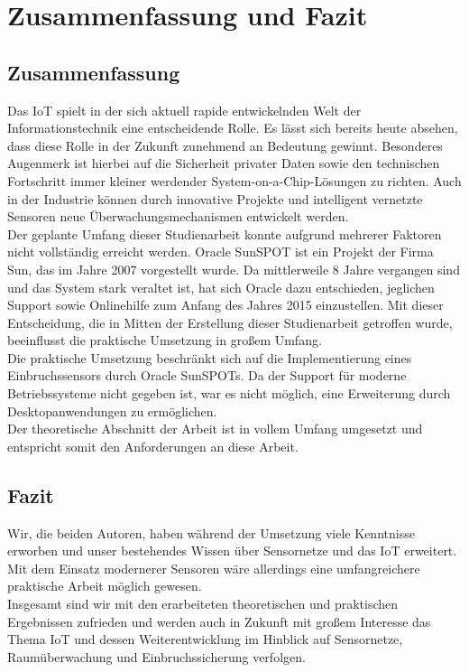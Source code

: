 \chapter{Zusammenfassung und Fazit}\label{c:Zusammenfassung} %

\section*{Zusammenfassung}
Das \ac{IoT} spielt in der sich aktuell rapide entwickelnden Welt der Informationstechnik eine entscheidende Rolle. Es lässt sich bereits heute absehen, dass diese Rolle in der Zukunft zunehmend an Bedeutung gewinnt. Besonderes Augenmerk ist hierbei auf die Sicherheit privater Daten sowie den technischen Fortschritt immer kleiner werdender System-on-a-Chip-Lösungen zu richten. Auch in der Industrie können durch innovative Projekte und intelligent vernetzte Sensoren neue Überwachungsmechanismen entwickelt werden.\\

Der geplante Umfang dieser Studienarbeit konnte aufgrund mehrerer Faktoren nicht vollständig erreicht werden. 
Oracle SunSPOT ist ein Projekt der Firma Sun, das im Jahre 2007 vorgestellt wurde. Da mittlerweile 8 Jahre vergangen sind und das System stark veraltet ist, hat sich Oracle dazu entschieden, jeglichen Support sowie Onlinehilfe zum Anfang des Jahres 2015 einzustellen. Mit dieser Entscheidung, die in Mitten der Erstellung dieser Studienarbeit getroffen wurde, beeinflusst die praktische Umsetzung in großem Umfang.\\

Die praktische Umsetzung beschränkt sich auf die Implementierung eines Einbruchssensors durch Oracle SunSPOTs. Da der Support für moderne Betriebssysteme nicht gegeben ist, war es nicht möglich, eine Erweiterung durch Desktopanwendungen zu ermöglichen. \\

Der theoretische Abschnitt der Arbeit ist in vollem Umfang umgesetzt und entspricht somit den Anforderungen an diese Arbeit.\newpage

\section*{Fazit}

Wir, die beiden Autoren, haben während der Umsetzung viele Kenntnisse erworben und unser bestehendes Wissen über Sensornetze und das \ac{IoT} erweitert. Mit dem Einsatz modernerer Sensoren wäre allerdings eine umfangreichere praktische Arbeit möglich gewesen.\\

Insgesamt sind wir mit den erarbeiteten theoretischen und praktischen Ergebnissen zufrieden und werden auch in Zukunft mit großem Interesse das Thema \ac{IoT} und dessen Weiterentwicklung im Hinblick auf Sensornetze, Raumüberwachung und Einbruchssicherung verfolgen. 